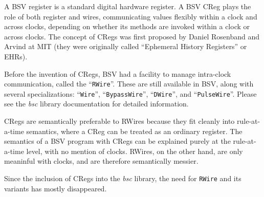 A BSV register is a standard digital hardware register.  A BSV CReg
plays the role of both register and wires, communicating values
flexibly within a clock and across clocks, depending on whether its
methods are invoked within a clock or across clocks.  The concept of
CRegs was first proposed by Daniel Rosenband and Arvind at MIT
\cite{RosenbandMEMOCODE04, Rosenband2005b} (they were originally
called ``Ephemeral History Registers'' or EHRs).

Before the invention of CRegs, BSV had a facility to manage
intra-clock communication, called the ``\verb|RWire|''.  These are
still available in BSV, along with several specializations:
``\verb|Wire|'', ``\verb|BypassWire|'', ``\verb|DWire|'', and
``\verb|PulseWire|''.  Please see the \emph{bsc} library documentation
for detailed information.

CRegs are semantically preferable to RWires because they fit cleanly
into rule-at-a-time semantics, where a CReg can be treated as an
ordinary register.  The semantics of a BSV program with CRegs can be
explained purely at the rule-at-a-time level, with no mention of
clocks.  RWires, on the other hand, are only meaninful with clocks,
and are therefore semantically messier.

Since the inclusion of CRegs into the \emph{bsc} library, the need for
\verb|RWire| and its variants has mostly disappeared.

